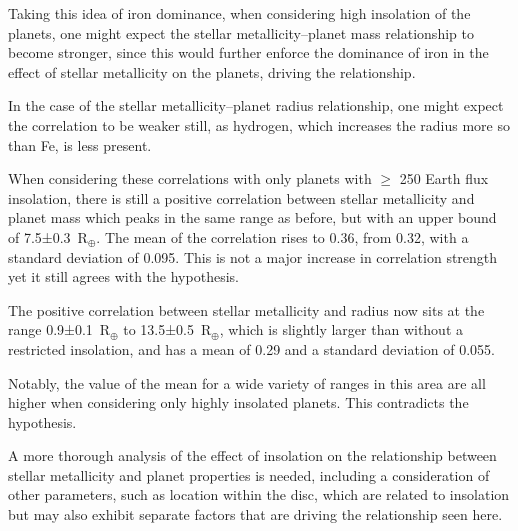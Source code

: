 \documentclass[a4paper,twocolumn,12pt]{article}
\begin{document}
Taking this idea of iron dominance, when considering high insolation of the planets, one might expect the stellar metallicity--planet mass relationship to become stronger, since this would further enforce the dominance of iron in the effect of stellar metallicity on the planets, driving the relationship.

In the case of the stellar metallicity--planet radius relationship, one might expect the correlation to be weaker still, as hydrogen, which increases the radius more so than Fe, is less present.

When considering these correlations with only planets with $\geq$ 250 Earth flux insolation, there is still a positive correlation between stellar metallicity and planet mass which peaks in the same range as before, but with an upper bound of 7.5±0.3~R$_\oplus$. The mean of the correlation rises to 0.36, from 0.32, with a standard deviation of 0.095. This is not a major increase in correlation strength yet it still agrees with the hypothesis.

The positive correlation between stellar metallicity and radius now sits at the range 0.9±0.1~R$_\oplus$ to 13.5±0.5~R$_\oplus$, which is slightly larger than without a restricted insolation, and has a mean of 0.29 and a standard deviation of 0.055.

Notably, the value of the mean for a wide variety of ranges in this area are all higher when considering only highly insolated planets. This contradicts the hypothesis.

A more thorough analysis of the effect of insolation on the relationship between stellar metallicity and planet properties is needed, including a consideration of other parameters, such as location within the disc, which are related to insolation but may also exhibit separate factors that are driving the relationship seen here.




\end{document}
